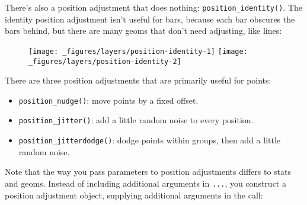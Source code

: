 There's also a position adjustment that does nothing:
\texttt{position\_identity()}. The identity position adjustment isn't
useful for bars, because each bar obscures the bars behind, but there
are many geoms that don't need adjusting, like lines:

\begin{Shaded}
\begin{Highlighting}[]
\StringTok{ }\NormalTok{(} \NormalTok{, }  \NormalTok{/}\StringTok{ }\NormalTok{, } \NormalTok{)}

 \StringTok{ }
\StringTok{  }\NormalTok{(}\NormalTok{(}  \NormalTok{) +}\StringTok{ }
\StringTok{  }\NormalTok{(}\NormalTok{) +}\StringTok{ }\NormalTok{(}\NormalTok{) +}\StringTok{ }
\StringTok{  }\NormalTok{(} \NormalTok{)}
\end{Highlighting}
\end{Shaded}

\begin{figure}[H]
  \texttt{[image: \_figures/layers/position-identity-1]}%
  \texttt{[image: \_figures/layers/position-identity-2]}
\end{figure}

There are three position adjustments that are primarily useful for
points:

\begin{itemize}
\tightlist
\item
  \texttt{position\_nudge()}: move points by a fixed offset.
\item
  \texttt{position\_jitter()}: add a little random noise to every
  position.
\item
  \texttt{position\_jitterdodge()}: dodge points within groups, then add
  a little random noise.
\end{itemize}

 

Note that the way you pass parameters to position adjustments differs to
stats and geoms. Instead of including additional arguments in
\texttt{...}, you construct a position adjustment object, supplying
additional arguments in the call:

